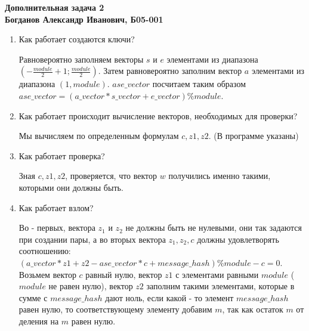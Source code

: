 \documentclass[a4paper,12pt]{article}
\begin{document}
 

\begin{center}
	\textbf{Дополнительная задача 2}\\
	\textbf{Богданов Александр Иванович,  Б05-001}\\
\end{center}

\begin{enumerate}

\item Как работает создаются ключи?

Равновероятно заполняем векторы $s$ и $e$ элементами из диапазона $(-\frac{module}{2} + 1; \frac{module}{2})$.  Затем равновероятно заполним вектор $a$ элементами из диапазона $(1,  module)$.  $ase\_vector$ посчитаем таким образом   $ase\_vector = (a\_vector * s\_vector + e\_vector) \% module$.

\item Как работает происходит вычисление векторов,  необходимых для проверки?

Мы вычисляем по определенным формулам $c,  z1,  z2$.  (В программе указаны)

\item Как работает проверка?

Зная $c,  z1,  z2$,  проверяется,  что вектор $w$ получились именно такими,  которыми они должны быть.

\item Как работает взлом?

Во - первых,  вектора $z_1$ и $z_2$ не должны быть не нулевыми,  они так задаются при создании пары,  а во вторых вектора $z_1,  z_2,  c$ должны удовлетворять соотношению: $(a\_vector * z1 + z2 - ase\_vector * c + message\_hash) \% module - c = 0$.  Возьмем вектор $c$ равный нулю,  вектор $z1$ с элементами равными $module$ ($module$ не равен нулю),  вектор $z2$ заполним такими элементами,  которые в сумме с $message\_hash$ дают ноль,  если какой - то элемент $message\_hash$ равен нулю,  то соответствующему элементу добавим $m$,  так как остаток $m$ от деления на $m$ равен нулю.

\end{enumerate}
\end{document}
